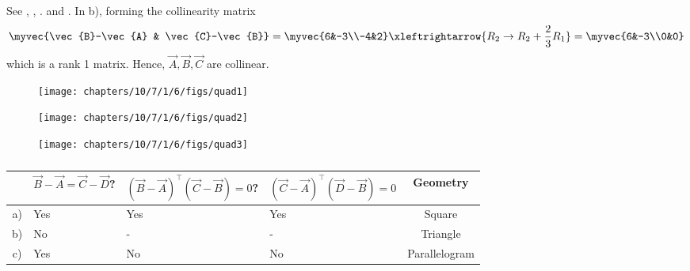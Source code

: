 	See ,
	, .
	and 
	. 
In b), forming the collinearity matrix
\begin{align}
\myvec{\vec{B}-\vec{A} & \vec{C}-\vec{B}} 
=
		\myvec{6&-3\\-4&2} \xleftrightarrow{R_{2}\rightarrow R_{2}+\frac{2}{3}R_{1}}= \myvec{6&-3\\0&0}
\end{align}
which is a rank 1 matrix.  Hence, $\vec{A}, \vec{B}, \vec{C}$  are collinear.
\begin{figure}[H]
	\begin{center} 
	    \texttt{[image: chapters/10/7/1/6/figs/quad1]}
	\end{center}
\caption{}
\label{fig:10/7/1/6/Fig1}
\end{figure}
%
\begin{figure}[H]
	\begin{center} 
	    \texttt{[image: chapters/10/7/1/6/figs/quad2]}
	\end{center}
\caption{}
\label{fig:10/7/1/6/Fig2}
\end{figure}
%	
\begin{figure}[H]
	\begin{center} 
	    \texttt{[image: chapters/10/7/1/6/figs/quad3]}
	\end{center}
\caption{}
\label{fig:10/7/1/6/Fig3}
\end{figure}
%
\begin{table}[H]
    \centering
	    \begin{tabularx}{\columnwidth}{|c|X|X|X|c|}
        \hline
		    &{\scriptsize $\vec{B}-\vec{A} = \vec{C}-\vec{D}$?} & {\tiny $(\vec{B}-\vec{A})^\top (\vec{C}-\vec{B}) =  0$?} & {\tiny $(\vec{C}-\vec{A})^\top (\vec{D}-\vec{B}) = 0$}& \textbf{Geometry}\\
        \hline
	    a)& Yes & Yes & Yes& Square \\
        \hline
	    b)& No & -&- & Triangle\\
        \hline
	    c)&Yes & No & No & Parallelogram\\
        \hline
	\end{tabularx}
	\caption{}
	\label{tab:10/7/1/6/inner}
\end{table}
